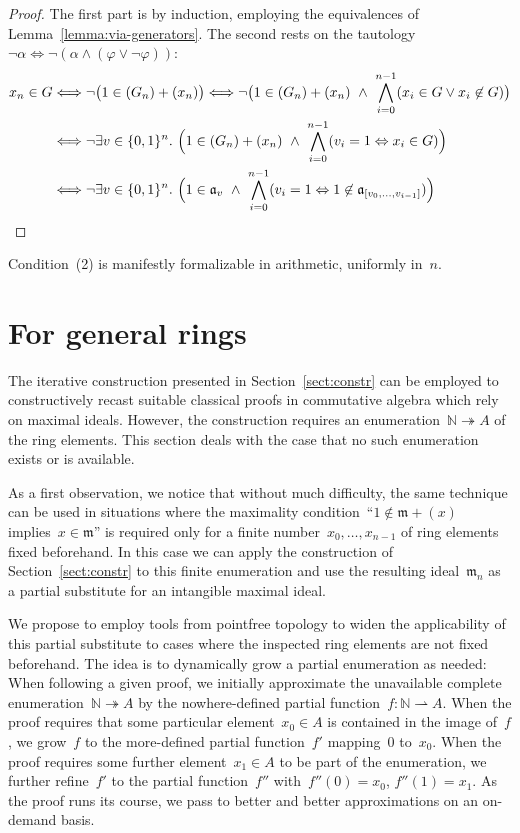 \documentclass[com,11pt,crcready]{iosart2x}
\theoremstyle{definition}
\theoremstyle{plain}
\theoremstyle{remark}
\newcommand{\aaa}{\mathfrak{a}}
\newcommand{\mmm}{\mathfrak{m}}
\newcommand{\NN}{\mathbb{N}}
\renewcommand{\_}{\mathpunct{.}\,}
\begin{document}
\begin{proof}\belowdisplayskip=-18pt The first part is by induction, employing the equivalences of
Lemma~\ref{lemma:via-generators}. The second rests on the tautology
$\neg\alpha \Longleftrightarrow \neg(\alpha \wedge (\varphi \vee \neg\varphi))$:
\begin{align*}
  x_n \in G &
  \Longleftrightarrow \neg\bigl(1 \in (G_n) + (x_n)\bigr)
  \Longleftrightarrow \neg\bigl(1 \in (G_n) + (x_n) \ \wedge\ \bigwedge_{i=0}^{n-1} (x_i \in G \vee x_i \not\in G)\bigr) \\
  & \Longleftrightarrow \neg\exists v \in \{0,1\}^n\_
    \Bigl(1 \in (G_n) + (x_n) \ \wedge\ \bigwedge_{i=0}^{n-1} (v_i = 1
    \Leftrightarrow x_i \in G)\Bigr) \\
  & \Longleftrightarrow \neg\exists v \in \{0,1\}^n\_
    \Bigl(1 \in \aaa_v \ \wedge\ \bigwedge_{i=0}^{n-1} (v_i = 1
    \Leftrightarrow 1 \not\in \aaa_{[v_0,\ldots,v_{i-1}]})\Bigr)
\end{align*}
\end{proof}

\noindent
Condition~(2) is manifestly formalizable in
arithmetic, uniformly in~$n$.


\section{For general rings}
\label{sect:wlog}

The iterative construction presented in Section~\ref{sect:constr}
can be employed to constructively recast suitable classical proofs in
commutative algebra which rely on maximal ideals. However, the construction requires an enumeration~$\NN
\twoheadrightarrow A$ of the ring elements. This section deals with the case
that no such enumeration exists or is available.

As a first observation, we notice that without much difficulty, the same technique can be used in situations where the
maximality condition~``$1 \not\in \mmm + (x)$ implies~$x \in \mmm$''
is required only for a finite number~$x_0,\ldots,x_{n-1}$ of ring elements
fixed beforehand. In this case we can apply the construction of Section~\ref{sect:constr} to
this finite enumeration and use the resulting ideal~$\mmm_n$ as a partial
substitute for an intangible maximal ideal.

We propose to employ tools from pointfree topology to
widen the applicability of this partial
substitute to cases where the inspected ring elements are
not fixed beforehand. The idea is to dynamically grow a partial enumeration as
needed: When following a given proof, we initially approximate the unavailable
complete enumeration~$\NN \twoheadrightarrow A$ by the nowhere-defined partial
function~$f : \NN \rightharpoonup A$. When the proof requires
that some particular element~$x_0 \in A$ is contained in the image of~$f$, we grow~$f$ to
the more-defined partial function~$f'$ mapping~$0$ to~$x_0$. When the proof
requires some further element~$x_1 \in A$ to be part of the enumeration, we further refine~$f'$
to the partial function~$f''$ with~$f''(0) = x_0$, $f''(1) = x_1$.
As the proof runs its course, we pass to better and better approximations on an
on-demand basis.
\end{document}
